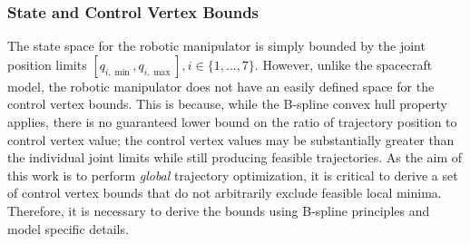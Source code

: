 \subsubsection{State and Control Vertex Bounds}
\label{sec:robot_state_cv_bounds}
The state space for the robotic manipulator is simply bounded by the joint position limits $[q_{i,\min}, q_{i,\max}], i \in \{1,\ldots,7\}$. 
However, unlike the spacecraft model, the robotic manipulator does not have an easily defined space for the control vertex bounds.  
This is because, while the B-spline convex hull property applies, there is no guaranteed lower bound on the ratio of trajectory position to control vertex value;
the control vertex values may be substantially greater than the individual joint limits while still producing feasible trajectories.
As the aim of this work is to perform \emph{global} trajectory optimization, it is critical to derive a set of control vertex bounds that do not arbitrarily exclude  feasible local minima.
Therefore, it is necessary to derive the bounds using B-spline principles and model specific details.

